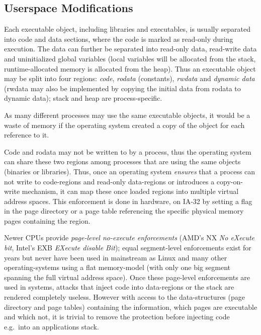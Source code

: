 \subsection{Userspace Modifications}

\label{userspace_attacks}

Each executable object, including libraries and executables, is usually
separated into code and data sections, where the code is marked as read-only
during execution. The data can further be separated into read-only data,
read-write data and uninitialized global variables (local variables will be
allocated from the stack, runtime-allocated memory is allocated from the heap).
Thus an executable object may be split into four regions: \emph{code},
\emph{rodata} (constants), \emph{rwdata} and \emph{dynamic data} (rwdata may
also be implemented by copying the initial data from rodata to dynamic data);
stack and heap are process-specific.

As many different processes may use the same executable objects, it would be a
waste of memory if the operating system created a copy of the object for each
reference to it.

Code and rodata may not be written to by a process, thus the operating system
can share these two regions among processes that are using the same objects
(binaries or libraries).  Thus, once an operating system \emph{ensures} that a
process can not write to code-regions and read-only data-regions or introduces a
copy-on-write mechanism, it can map these once loaded regions into multiple
virtual address spaces.  This enforcement is done in hardware, on IA-32 by
setting a flag in the page directory or a page table referencing the specific
physical memory pages containing the region.

Newer CPUs provide \emph{page-level no-execute enforcements} (AMD's NX \emph{No
eXecute bit}, Intel's EXB \emph{EXecute disable Bit}); equal segment-level
enforcements exist for years but never have been used in mainstream as Linux and
many other operating-systems using a flat memory-model (with only one big
segment spanning the full virtual address space).  Once these page-level
enforcements are used in systems, attacks that inject code into data-regions or
the stack are rendered completely useless. However with access to the
data-structures (page directory and page tables) containing the information,
which pages are executable and which not, it is trivial to remove the protection
before injecting code e.g.~into an applications stack. 

